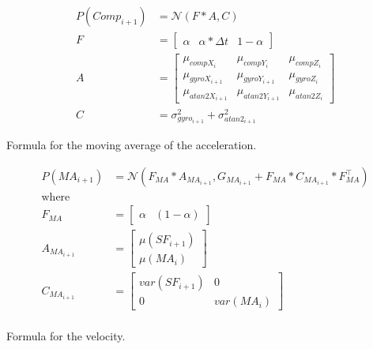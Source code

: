 \begin{equation}
\begin{aligned}
     P(Comp_{i+1}) &= \mathcal{N}(F*A,C)\\
     F &= \begin{bmatrix}
     \alpha & \alpha*\Delta t & 1- \alpha
     \end{bmatrix}\\
     A &= \begin{bmatrix}
          \mu_{compX_{i}} & \mu_{compY_{i}} & \mu_{compZ_{i}}\\
          \mu_{gyroX_{i+1}} & \mu_{gyroY_{i+1}} & \mu_{gyroZ_{i}}\\
          \mu_{atan2X_{i+1}} & \mu_{atan2Y_{i+1}} & \mu_{atan2Z_{i}}
     \end{bmatrix}\\
     C &= \sigma^2_{gyro_{i+1}} + \sigma^2_{atan2_{i+1}}
\end{aligned}
\end{equation}





Formula for the moving average of the acceleration.

\begin{equation}
	\begin{aligned}
		P(MA_{i+1})&=\mathcal{N}(F_{MA}*A_{MA_{i+1}},G_{MA_{i+1}}+F_{MA}*C_{MA_{i+1}}*F_{MA}^\intercal)\\
		\text{where}&\\
		F_{MA}&=\begin{bmatrix} \alpha & (1-\alpha)\end{bmatrix}\\
		A_{MA_{i+1}}&=\begin{bmatrix} \mu(SF_{i+1}) \\ \mu(MA_i)\end{bmatrix}\\	
		C_{MA_{i+1}}&=\begin{bmatrix} var(SF_{i+1}) & 0 \\ 0 & var(MA_{i}) \end{bmatrix}\\
	\end{aligned}
\end{equation}

Formula for the velocity.

